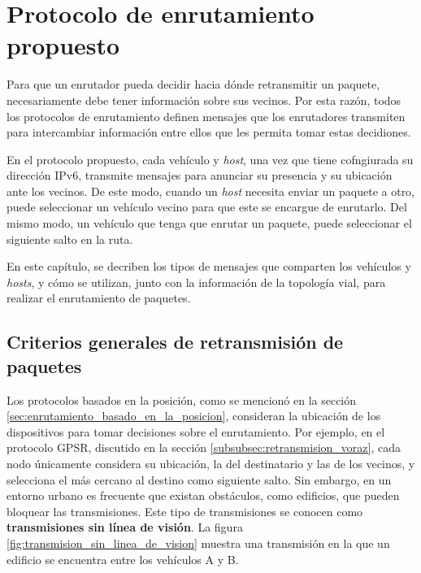 ﻿\chapter{Protocolo de enrutamiento propuesto}
\label{ch:protocolo_de_enrutamiento_propuesto}

Para que un enrutador pueda decidir hacia dónde retransmitir un paquete,
necesariamente debe tener información sobre sus vecinos. Por esta razón, todos
los protocolos de enrutamiento definen mensajes que los enrutadores transmiten
para intercambiar información entre ellos que les permita tomar estas
decidiones.

En el protocolo propuesto, cada vehículo y \textit{host}, una vez que tiene
cofngiurada su dirección IPv6, transmite mensajes para anunciar su presencia y
su ubicación ante los vecinos. De este modo, cuando un \textit{host} necesita
enviar un paquete a otro, puede seleccionar un vehículo vecino para que este se
encargue de enrutarlo. Del mismo modo, un vehículo que tenga que enrutar un
paquete, puede seleccionar el siguiente salto en la ruta.

En este capítulo, se decriben los tipos de mensajes que comparten los vehículos
y \textit{hosts}, y cómo se utilizan, junto con la información de la topología
vial, para realizar el enrutamiento de paquetes. 

\section{Criterios generales de retransmisión de paquetes}
\label{sec:criterios_generales_retransmision_paquetes}

Los protocolos basados en la posición, como se mencionó en la sección
\ref{sec:enrutamiento_basado_en_la_posicion}, consideran la ubicación de los
dispositivos para tomar decisiones sobre el enrutamiento. Por ejemplo, en el
protocolo GPSR, discutido en la sección \ref{subsubsec:retransmision_voraz},
cada nodo únicamente considera su ubicación, la del destinatario y las de los
vecinos, y selecciona el más cercano al destino como siguiente salto. Sin
embargo, en un entorno urbano es frecuente que existan obstáculos, como
edificios, que pueden bloquear las transmisiones. Este tipo de transmisiones se
conocen como \textbf{transmisiones sin línea de visión}. La figura
\ref{fig:transmision_sin_linea_de_vision} muestra una transmisión en la que un
edificio se encuentra entre los vehículos A y B.

